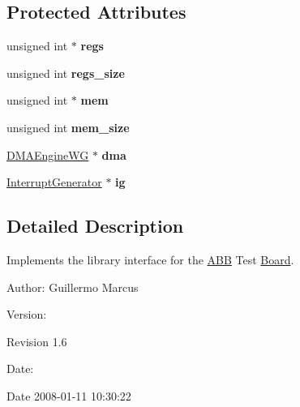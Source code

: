 \subsection*{Protected Attributes}
\begin{CompactItemize}
\item 
\hypertarget{classmprace_1_1ABB_p0}{
unsigned int $\ast$ {\bf regs}}
\label{classmprace_1_1ABB_p0}

\item 
\hypertarget{classmprace_1_1ABB_p1}{
unsigned int {\bf regs\_\-size}}
\label{classmprace_1_1ABB_p1}

\item 
\hypertarget{classmprace_1_1ABB_p2}{
unsigned int $\ast$ {\bf mem}}
\label{classmprace_1_1ABB_p2}

\item 
\hypertarget{classmprace_1_1ABB_p3}{
unsigned int {\bf mem\_\-size}}
\label{classmprace_1_1ABB_p3}

\item 
\hypertarget{classmprace_1_1ABB_p4}{
\hyperlink{classmprace_1_1DMAEngineWG}{DMAEngine\-WG} $\ast$ {\bf dma}}
\label{classmprace_1_1ABB_p4}

\item 
\hypertarget{classmprace_1_1ABB_p5}{
\hyperlink{classmprace_1_1InterruptGenerator}{Interrupt\-Generator} $\ast$ {\bf ig}}
\label{classmprace_1_1ABB_p5}

\end{CompactItemize}


\subsection{Detailed Description}
Implements the library interface for the \hyperlink{classmprace_1_1ABB}{ABB} Test \hyperlink{classmprace_1_1Board}{Board}. 

\begin{Desc}
\item[Author:]Guillermo Marcus \end{Desc}
\begin{Desc}
\item[Version:]\begin{Desc}
\item[Revision]1.6 \end{Desc}
\end{Desc}
\begin{Desc}
\item[Date:]\begin{Desc}
\item[Date]2008-01-11 10:30:22 \end{Desc}
\end{Desc}




